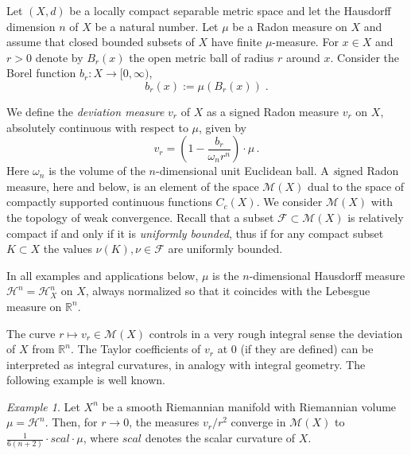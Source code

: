 \documentclass[12pt,leqno]{amsart}
\numberwithin{equation}{section}
\theoremstyle{definition}
\theoremstyle{remark}
\newtheorem{ex}[thm]{Example}
\newcommand{\R}{\mathbb{R}}
\begin{document}
Let $(X,d)$ be a locally compact separable metric space and let the Hausdorff dimension $n$ of $X$ be a natural number. Let $\mu$ be   a  Radon  measure on $X$ and assume that closed bounded subsets
of $X$ have finite $\mu$-measure.
For $x\in X$ and $r>0$
denote by $B_r (x)$ the open metric ball of radius $r$ around  $x$. Consider  the Borel function $b_r:X\to [0,\infty )$,
\begin{equation}
 b_r(x):=\mu (B_r (x)) \; .
 \end{equation}

We define the \emph{deviation measure} $v_r$ of $X$ as a signed Radon measure $v_r$ on $X$, absolutely continuous with respect to $\mu$,   given by
\begin{equation} \label{eq:first}
 v_r  = (1 - \frac {b_r} { \omega _n r^n} )\cdot \mu \, .
\end{equation}
Here $\omega _n$ is the volume of the $n$-dimensional unit Euclidean ball.
A {\emph signed Radon measure}, here and below, is  an element of the space $\mathcal M(X)$ dual to the space of compactly supported continuous functions $C_c (X)$.
We  consider $\mathcal M(X)$ with the topology of weak convergence. { Recall that a subset $\mathcal F \subset \mathcal M(X)$ is relatively compact if and only if 
it is \emph{uniformly bounded}, thus if for any compact subset $K\subset X$ the values $\nu  (K), \nu \in \mathcal F$ are uniformly bounded.}

In all examples and applications below,
 $\mu$ is the $n$-dimensional Hausdorff measure $\mathcal H^n =\mathcal H^n _X$ on $X$, always normalized so that it coincides with the Lebesgue measure on $\R^n$.


The curve $r\mapsto  v_r \in \mathcal M(X)$ controls in a very rough integral sense the deviation of $X$ from $\R^n$.
The Taylor coefficients of $v_r$ at $0$ (if they are defined) can be interpreted as integral curvatures, in analogy with integral geometry. The following  example is well known.



    \begin{ex} \label{smoothscal}
 Let $X^n$ be a  smooth Riemannian manifold with  Riemannian volume $\mu =\mathcal H^n$.  Then, for $r\to 0$,
  the measures $v_r /r^2$ converge in $\mathcal M(X)$ to $\frac 1 {6(n+2)}\cdot scal \cdot \mu$, where
  $scal$ denotes the scalar curvature of $X$.
\end{ex}
\end{document}
